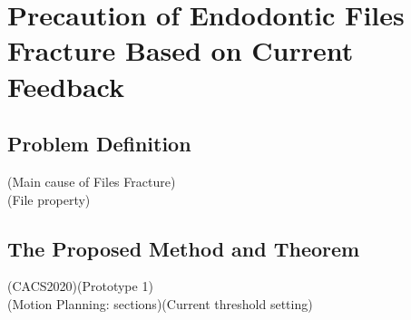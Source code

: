\chapter{Precaution of Endodontic Files Fracture Based on Current Feedback}
\section{Problem Definition}
(Main cause of Files Fracture)					\\
(File property)
\section{The Proposed Method and Theorem}
(CACS2020)(Prototype 1)							\\
(Motion Planning: sections)(Current threshold setting)